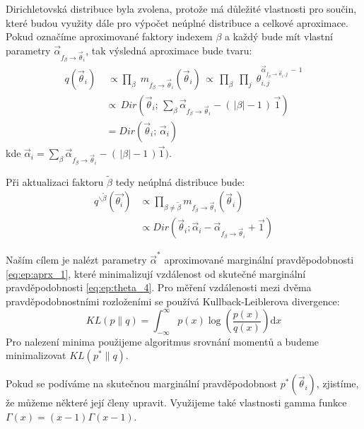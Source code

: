 Dirichletovská distribuce byla zvolena, protože má důležité vlastnosti pro
součin, které budou využity dále pro výpočet neúplné distribuce a celkové
aproximace. Pokud označíme aproximované faktory indexem $\beta$ a každý bude
mít vlastní parametry $\vec\alpha_{f_\beta \rightarrow \vec\theta_i}$, tak výsledná aproximace bude
tvaru:
\begin{align}
q(\vec{\theta}_i) \,& \, \propto
    \prod_\beta \;
    m_{f_\beta \rightarrow \vec{\theta}_i}(\vec{\theta}_i) \,
 \propto \,
    \prod_\beta \;
        \prod_j \;
            \theta_{i,j}^{\vec\alpha_{f_\beta \rightarrow \vec\theta_i, j} \,-\, 1}
\\
&\propto \,
    Dir(\vec{\theta}_i ;\, \sum_\beta \vec\alpha_{f_\beta \rightarrow \vec\theta_i} - (\,|\beta| - 1\,) \, \vec{1})
\\
&=
    Dir(\vec{\theta}_i;\,
        \vec{\alpha}_i)
\label{eq:ep:aprx_1}
\end{align}
kde $\vec{\alpha}_i = \sum_\beta \vec\alpha_{f_\beta \rightarrow \vec\theta_i} - (\,|\beta| - 1\,)
\vec{1})$.

Při aktualizaci faktoru $\tilde\beta$ tedy neúplná distribuce bude:
\begin{align}
q^{\backslash \tilde\beta} (\vec{\theta_i})
&\propto
    \prod_{\beta \ne \tilde\beta}
        m_{f_\beta \rightarrow \vec{\theta}_i}(\vec{\theta}_i)
\\
& \propto
Dir(\vec{\theta}_i;
    \vec{\alpha}_i - \vec\alpha_{f_\beta \rightarrow \vec\theta_i} + \vec{1})
\end{align}

Naším cílem je nalézt parametry $\vec{\alpha}^*$ aproximované marginální
pravděpodobnosti \eqref{eq:ep:aprx_1}, které minimalizují vzdálenost od
skutečné marginální pravděpodobnosti \eqref{eq:ep:theta_4}. Pro měření
vzdálenosti mezi dvěma pravděpodobnostními rozloženími se používá
Kullback-Leiblerova divergence:
\begin{equation}
KL(p \| q) =
\int_{-\infty}^{\infty}
    p(x) \log\left(\frac{p(x)}{q(x)}\right) \mathrm{d}x
\end{equation}
Pro nalezení minima použijeme algoritmus srovnání momentů a budeme
minimalizovat $KL(p^*\| q)$.

Pokud se podíváme na skutečnou marginální pravděpodobnost
$p^*(\vec{\theta}_i)$, zjistíme, že můžeme některé její členy upravit.
Využijeme také vlastnosti gamma funkce $\Gamma(x) = (x-1) \Gamma(x-1)$.

